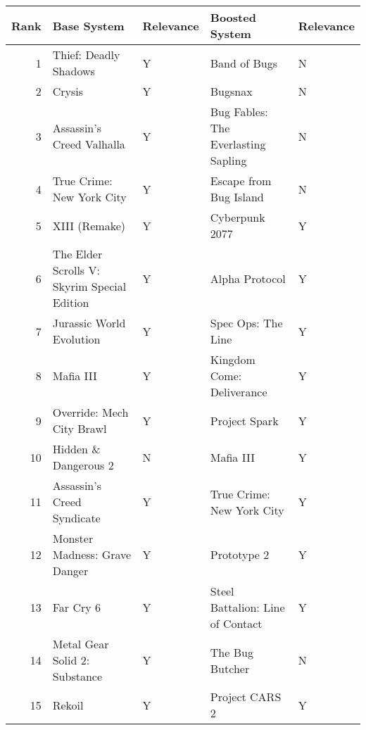 \begin{tabular}{rllll}
\toprule
 Rank &                                 Base System & Relevance &                              Boosted System & Relevance \\
\midrule
    1 &                       Thief: Deadly Shadows &         Y &                                Band of Bugs &         N \\
    2 &                                      Crysis &         Y &                                     Bugsnax &         N \\
    3 &                   Assassin's Creed Valhalla &         Y &         Bug Fables: The Everlasting Sapling &         N \\
    4 &                   True Crime: New York City &         Y &                      Escape from Bug Island &         N \\
    5 &                               XIII (Remake) &         Y &                              Cyberpunk 2077 &         Y \\
    6 & The Elder Scrolls V: Skyrim Special Edition &         Y &                              Alpha Protocol &         Y \\
    7 &                    Jurassic World Evolution &         Y &                          Spec Ops: The Line &         Y \\
    8 &                                   Mafia III &         Y &                   Kingdom Come: Deliverance &         Y \\
    9 &                   Override: Mech City Brawl &         Y &                               Project Spark &         Y \\
   10 &                        Hidden \& Dangerous 2 &         N &                                   Mafia III &         Y \\
   11 &                  Assassin's Creed Syndicate &         Y &                   True Crime: New York City &         Y \\
   12 &               Monster Madness: Grave Danger &         Y &                                 Prototype 2 &         Y \\
   13 &                                   Far Cry 6 &         Y &            Steel Battalion: Line of Contact &         Y \\
   14 &               Metal Gear Solid 2: Substance &         Y &                             The Bug Butcher &         N \\
   15 &                                      Rekoil &         Y &                              Project CARS 2 &         Y \\

\end{tabular}
